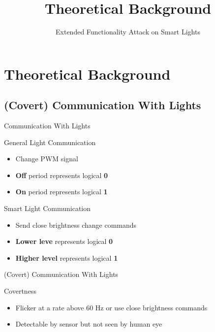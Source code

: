 \documentclass[11pt,t,usepdftitle=false,aspectratio=169]{beamer}
\begin{document}
\section{Theoretical Background} %
\label{sec:theory}
\title{Theoretical Background} 
\subtitle{Extended Functionality Attack on Smart Lights} %

\subsection{(Covert) Communication With Lights} %
\label{sub:covert_light_communication}
\begin{frame}{Communication With Lights}
	\begin{block}{General Light Communication}
		\begin{itemize}
			\item Change PWM signal
			\item \textbf{Off} period represents logical \textbf{0}
			\item \textbf{On} period represents logical \textbf{1}
		\end{itemize}
		
	\end{block}
	\begin{block}{Smart Light Communication}
		\begin{itemize}
			\item Send close brightness change commands
			\item \textbf{Lower leve} represents logical \textbf{0}
			\item \textbf{Higher level} represents logical \textbf{1}
		\end{itemize}
	\end{block}
\end{frame}
\begin{frame}{(Covert) Communication With Lights}
	\begin{block}{Covertness}
	\begin{itemize}
		\item Flicker at a rate above 60 Hz or use close brightness commands
		\item Detectable by sensor but not seen by human eye
	\end{itemize}
\end{block}
\end{frame}
\end{document}
